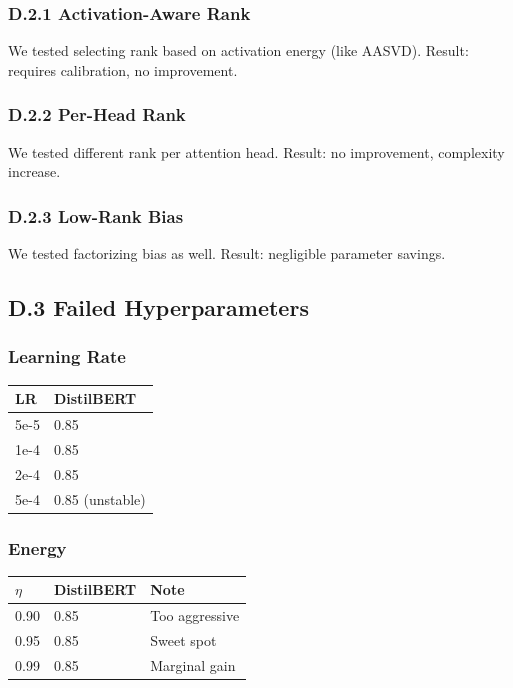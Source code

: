 \subsubsection{D.2.1 Activation-Aware Rank}

We tested selecting rank based on activation energy (like AASVD). Result: 
requires calibration, no improvement.

\subsubsection{D.2.2 Per-Head Rank}

We tested different rank per attention head. Result: no improvement, 
complexity increase.

\subsubsection{D.2.3 Low-Rank Bias}

We tested factorizing bias as well. Result: negligible parameter savings.

\subsection{D.3 Failed Hyperparameters}

\subsubsection{Learning Rate}

\begin{table}[H]
\centering
\small
\begin{tabular}{ll}
\toprule
\textbf{LR} & \textbf{DistilBERT} \\
\midrule
5e-5 & 0.85 \\
1e-4 & 0.85 \\
2e-4 & 0.85 \\
5e-4 & 0.85 (unstable) \\
\bottomrule
\end{tabular}
\end{table}

\subsubsection{Energy}

\begin{table}[H]
\centering
\small
\begin{tabular}{lll}
\toprule
\textbf{$\eta$} & \textbf{DistilBERT} & \textbf{Note} \\
\midrule
0.90 & 0.85 & Too aggressive \\
0.95 & 0.85 & Sweet spot \\
0.99 & 0.85 & Marginal gain \\
\bottomrule
\end{tabular}
\end{table}

